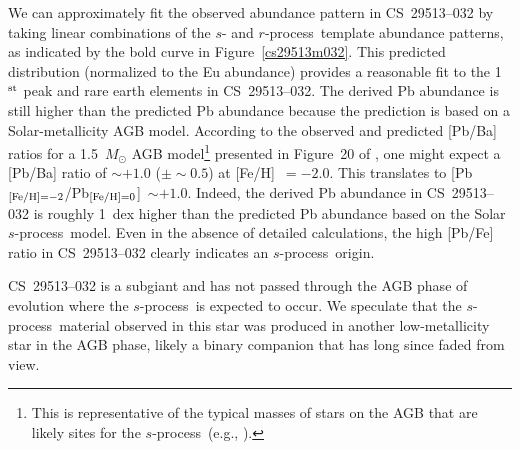 \documentclass{emulateapj}
\def\rpro{\mbox{$r$-process}}
\def\spro{\mbox{$s$-process}}
\begin{document}
We can approximately fit the observed abundance pattern
in \mbox{CS~29513--032} by taking linear combinations of the
$s$- and \rpro\ template abundance patterns, as indicated by the bold
curve in Figure~\ref{cs29513m032}.
This predicted distribution (normalized to the Eu abundance)
provides a reasonable fit to the
1$^{\rm st}$ peak and rare earth elements in 
\mbox{CS~29513--032}.
The derived Pb abundance is still higher than the predicted Pb
abundance because the prediction is based on a Solar-metallicity
AGB model.
According to the observed and predicted [Pb/Ba] ratios for a
1.5~$M_{\odot}$ AGB model\footnote{
This is representative of the typical masses of stars on the AGB
that are likely sites for the \spro\ 
(e.g., \citealt{bisterzo09}).
} 
presented in Figure~20 of \citet{sneden08}, one might expect
a [Pb/Ba] ratio of $\sim +1.0$ ($\pm \sim 0.5$) at [Fe/H]~$= -2.0$.
This translates to [Pb$_{\rm [Fe/H]=-2}$/Pb$_{\rm [Fe/H]=0}$]~$\sim +1.0$.
Indeed, the derived Pb abundance in \mbox{CS~29513--032} is
roughly 1~dex higher than the predicted Pb abundance based on the
Solar \spro\ model.
Even in the absence of detailed calculations, the high [Pb/Fe] ratio
in \mbox{CS~29513--032} clearly indicates an \spro\ origin.

\mbox{CS~29513--032} is a subgiant and has not passed 
through the AGB phase of evolution
where the \spro\ is expected to occur.
We speculate that
the \spro\ material observed in this star was produced in another
low-metallicity star in the AGB phase,
likely a binary companion that has long since faded from view.
\end{document}
